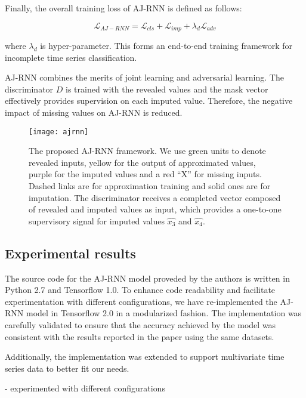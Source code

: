 Finally, the overall training loss of AJ-RNN is defined as follows:

\begin{equation}
  \mathcal{L}_{AJ-RNN} = \mathcal{L}_{cls} + \mathcal{L}_{imp} + \lambda_d \mathcal{L}_{adv}
  \label{eq:AJRNNloss}
\end{equation}

where $\lambda_d$ is hyper-parameter. This forms an end-to-end
training framework for incomplete time series classification.

AJ-RNN combines the merits of joint learning and adversarial learning.
The discriminator $D$ is trained with the revealed values and the mask vector effectively provides supervision on each imputed value. 
Therefore, the negative impact of missing values on AJ-RNN is reduced.

\begin{figure}[ht]
  \centering
  \texttt{[image: ajrnn]}
  \caption{The proposed AJ-RNN framework. We use green units to denote revealed inputs, yellow for the output of approximated values, purple for
  the imputed values and a red “X” for missing inputs. Dashed links are for approximation training and solid ones are for imputation. The discriminator
  receives a completed vector composed of revealed and imputed values as input, which provides a one-to-one supervisory signal for imputed values
  $\hat{x_3}$ and $\hat{x_4}$. \cite{ajrnn}}
  \label{fig:AJRNNrchitecture}
\end{figure}

\subsection{Experimental results}

The source code for the AJ-RNN model proveded by the authors is written in Python 2.7 and Tensorflow 1.0.
To enhance code readability and facilitate experimentation with different configurations, we have re-implemented the AJ-RNN model in Tensorflow 2.0 in a modularized fashion.
The implementation was carefully validated to ensure that the accuracy achieved by the model was consistent with the results reported in the paper using the same datasets. 

Additionally, the implementation was extended to support multivariate time series data to better fit our needs.

- experimented with different configurations 

